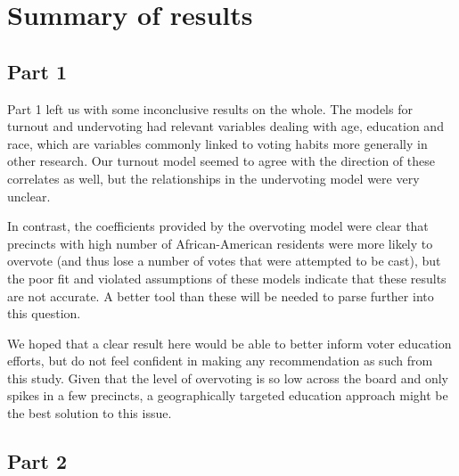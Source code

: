 \documentclass[12pt,twoside]{reedthesis}
\begin{document}
\hypertarget{summary-of-results}{%
\section{Summary of results}\label{summary-of-results}}

\hypertarget{part-1-1}{%
\subsection{Part 1}\label{part-1-1}}

Part 1 left us with some inconclusive results on the whole. The models for turnout and undervoting had relevant variables dealing with age, education and race, which are variables commonly linked to voting habits more generally in other research. Our turnout model seemed to agree with the direction of these correlates as well, but the relationships in the undervoting model were very unclear.

In contrast, the coefficients provided by the overvoting model were clear that precincts with high number of African-American residents were more likely to overvote (and thus lose a number of votes that were attempted to be cast), but the poor fit and violated assumptions of these models indicate that these results are not accurate. A better tool than these will be needed to parse further into this question.

We hoped that a clear result here would be able to better inform voter education efforts, but do not feel confident in making any recommendation as such from this study. Given that the level of overvoting is so low across the board and only spikes in a few precincts, a geographically targeted education approach might be the best solution to this issue.

\hypertarget{part-2-1}{%
\subsection{Part 2}\label{part-2-1}}
\end{document}
